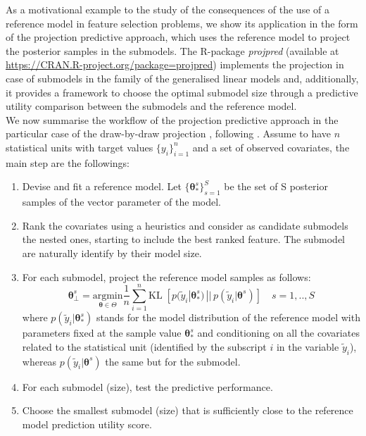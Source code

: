 \documentclass[american,]{article}
\theoremstyle{definition}
\begin{document}
As a motivational example to the study of the consequences of the use of a reference model in feature selection problems, we show its application in the form of the projection predictive approach, which uses the reference model to project the posterior samples in the submodels. The R-package \textit{projpred} (available at \url{https://CRAN.R-project.org/package=projpred}) implements the projection in case of submodels in the family of the generalised linear models and, additionally, it provides a framework to choose the optimal submodel size through a predictive utility comparison between the submodels and the reference model. 
\\
We now summarise the workflow of the projection predictive approach in the particular case of the draw-by-draw projection \cite[original formulation by][]{paper:original_proj}, following \cite{paper:projpred}. Assume to have $n$ statistical units with target values $\{y_{i}\}_{i=1}^{n}$ and a set of observed covariates, the main step are the followings:
\begin{enumerate}
\item Devise and fit a reference model. Let $\{\boldsymbol{\theta}_{*}^{s}\}_{s=1}^{S}$ be the set of S posterior samples of the vector parameter of the model.
\item Rank the covariates using a heuristics and consider as candidate submodels the nested ones, starting to include the best ranked feature. The submodel are naturally identify by their model size.
\item For each submodel, project the reference model samples as follows:
\begin{equation}\label{eq:draw_by_draw}
\boldsymbol{\theta}_{\perp}^{s} = \underset{\boldsymbol{\theta}\in\Theta}{\text{argmin}} \frac{1}{n}\sum_{i=1}^{n}\text{KL}\;[p(\tilde{y}_{i}|\boldsymbol{\theta}_{*}^{s})\,||\,p(\tilde{y}_{i}|\boldsymbol{\theta}^{s})] \quad s=1,..,S
\end{equation}
where $p(\tilde{y}_{i}|\boldsymbol{\theta}_{*}^{s})$ stands for the model distribution of the reference model with parameters fixed at the sample value $\boldsymbol{\theta}_{*}^{s}$ and conditioning on all the covariates related to the statistical unit (identified by the subscript $i$ in the variable $\tilde{y}_{i}$), whereas $p(\tilde{y}_{i}|\boldsymbol{\theta}^{s})$ the same but for the submodel.
\item For each submodel (size), test the predictive performance.
\item Choose the smallest submodel (size) that is sufficiently close to the reference model prediction utility score.
\end{enumerate} 
\end{document}
